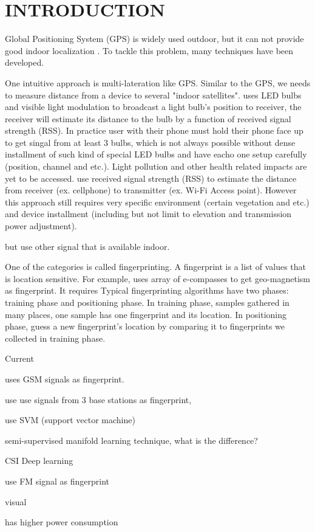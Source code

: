 \chapter{INTRODUCTION}

Global Positioning System (GPS) is widely used outdoor, but it can not provide good indoor localization \cite{pulkkinen2011semi, varshavsky2007gsm}. To tackle this problem, many techniques have been developed. 

One intuitive approach is multi-lateration like GPS. Similar to the GPS, we needs to measure distance from a device to several "indoor satellites". \cite{hu2013pharos} uses LED bulbs and visible light modulation to broadcast a light bulb's position to receiver, the receiver will estimate its distance to the bulb by a function of received signal strength (RSS). In practice user with their phone must hold their phone face up to get singal from at least 3 bulbs, which is not always possible without dense installment of such kind of special LED bulbs and have eacho one setup carefully (position, channel and etc.). Light pollution and other health related impacts are yet to be accessed. \cite{whitehouse2007practical} use received signal strength (RSS) to estimate the distance from receiver (ex. cellphone) to transmitter (ex. Wi-Fi Access point). However this approach still requires very specific environment (certain vegetation and etc.) and device installment (including but not limit to elevation and transmission power adjustment). 

but use other signal that is available indoor.

 
One of the categories is called fingerprinting. A fingerprint is a list of values that is location sensitive. For example, \cite{chung2011indoor} uses array of e-compasses to get geo-magnetism as fingerprint. It requires  Typical fingerprinting algorithms have two phases: training phase and positioning phase. In training phase, samples gathered in many places, one sample has one fingerprint and its location. In positioning phase, guess a new fingerprint's location by comparing it to fingerprints we collected in training phase. 

Current 


\cite{varshavsky2007gsm} uses GSM signals as fingerprint. 

\cite{bahl2000radar} use use signals from 3 base stations as fingerprint,

\cite{brunato2005statistical} use SVM (support vector machine)

\cite{pulkkinen2011semi}semi-supervised manifold learning technique, what is the difference? 

CSI Deep learning

\cite{chen2012fm} use FM signal as fingerprint

visual

has higher power consumption
